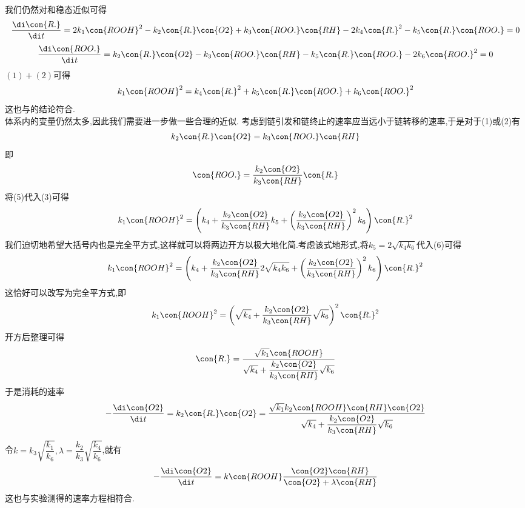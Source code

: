 \documentclass{ctexart}
\begin{document}
\begin{derivation}\setcounter{equation}{0}
    我们仍然对和稳态近似可得
    \begin{equation}
        \dfrac{\di\con{R.}}{\di t}=2k_1\con{ROOH}^2-k_2\con{R.}\con{O2}+k_3\con{ROO.}\con{RH}-2k_4\con{R.}^2-k_5\con{R.}\con{ROO.}=0
    \end{equation}
    \begin{equation}
        \dfrac{\di\con{ROO.}}{\di t}=k_2\con{R.}\con{O2}-k_3\con{ROO.}\con{RH}-k_5\con{R.}\con{ROO.}-2k_6\con{ROO.}^2=0
    \end{equation}
    $(1)+(2)$可得
    \begin{equation}
        k_1\con{ROOH}^2=k_4\con{R.}^2+k_5\con{R.}\con{ROO.}+k_6\con{ROO.}^2
    \end{equation}
    这也与的结论符合.\\
    体系内的变量仍然太多,因此我们需要进一步做一些合理的近似.%
    考虑到链引发和链终止的速率应当远小于链转移的速率,于是对于(1)或(2)有
    \begin{equation}
        k_2\con{R.}\con{O2}=k_3\con{ROO.}\con{RH}
    \end{equation}
    即
    \begin{equation}
        \con{ROO.}=\dfrac{k_2\con{O2}}{k_3\con{RH}}\con{R.}
    \end{equation}
    将(5)代入(3)可得
    \begin{equation}
        k_1\con{ROOH}^2=\left(k_4+\dfrac{k_2\con{O2}}{k_3\con{RH}}k_5+\left(\dfrac{k_2\con{O2}}{k_3\con{RH}}\right)^2k_6\right)\con{R.}^2
    \end{equation}
    我们迫切地希望大括号内也是完全平方式,这样就可以将两边开方以极大地化简.考虑该式地形式,将$k_5=2\sqrt{k_4k_6}$代入(6)可得
    \begin{equation}
        k_1\con{ROOH}^2=\left(k_4+\dfrac{k_2\con{O2}}{k_3\con{RH}}2\sqrt{k_4k_6}+\left(\dfrac{k_2\con{O2}}{k_3\con{RH}}\right)^2k_6\right)\con{R.}^2
    \end{equation}
    这恰好可以改写为完全平方式,即
    \begin{equation}
        k_1\con{ROOH}^2=\left(\sqrt{k_4}+\dfrac{k_2\con{O2}}{k_3\con{RH}}\sqrt{k_6}\right)^2\con{R.}^2
    \end{equation}
    开方后整理可得
    \begin{equation}
        \con{R.}=\dfrac{\sqrt{k_1}\con{ROOH}}{\sqrt{k_4}+\dfrac{k_2\con{O2}}{k_3\con{RH}}\sqrt{k_6}}
    \end{equation}
    于是消耗的速率
    \begin{equation}
        -\dfrac{\di\con{O2}}{\di t}=k_2\con{R.}\con{O2}=\dfrac{\sqrt{k_1}k_2\con{ROOH}\con{RH}\con{O2}}{\sqrt{k_4}+\dfrac{k_2\con{O2}}{k_3\con{RH}}\sqrt{k_6}}
    \end{equation}
    令$k=k_3\sqrt{\dfrac{k_1}{k_6}},\lambda=\dfrac{k_2}{k_3}\sqrt{\dfrac{k_4}{k_6}}$,就有
    \begin{equation}
        -\dfrac{\di\con{O2}}{\di t}=k\con{ROOH}\dfrac{\con{O2}\con{RH}}{\con{O2}+\lambda\con{RH}}
    \end{equation}
    这也与实验测得的速率方程相符合.
\end{derivation}
\end{document}
